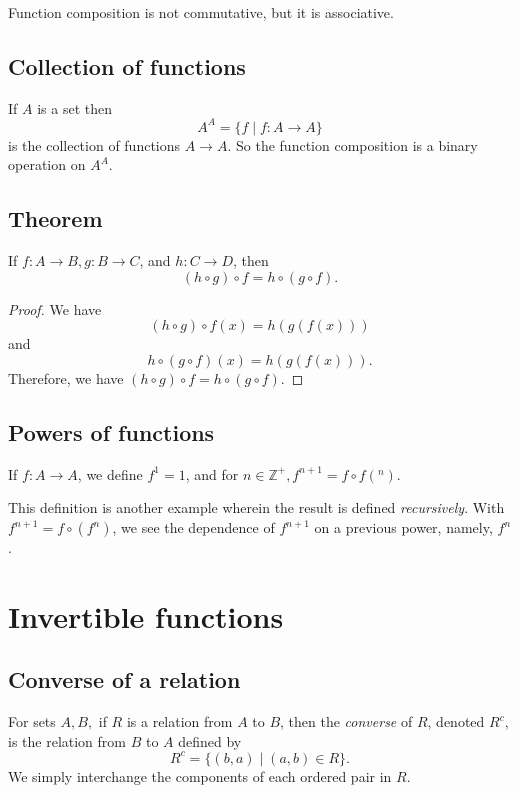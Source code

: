 \documentclass[11pt]{article}
\begin{document}
    Function composition is not commutative, but it is associative.

    \subsection{Collection of functions}

    If $A$ is a set then \[A^A = \{f \mid f:A \rightarrow A\}\] is the collection of functions \(A \rightarrow A\). So the function composition is a binary operation on $A^A$.

    \subsection{Theorem}

    If \(f: A \rightarrow B, g: B \rightarrow C\), and \(h:C \rightarrow D\), then \[ (h \circ g) \circ f = h \circ (g \circ f). \]

    \begin{proof}
        We have \[(h \circ g) \circ f(x) = h(g(f(x)))\] and \[h \circ (g \circ f)(x) = h(g(f(x))).\] Therefore, we have \((h \circ g) \circ f = h \circ (g \circ f).\)
    \end{proof}

    \subsection{Powers of functions}

    If \(f:A \rightarrow A\), we define \(f^1 = 1\), and for \(n \in \mathbb{Z}^+, f^{n+1} = f \circ f(^n).\)

    \vspace{1em}

    This definition is another example wherein the result is defined \emph{recursively}. With \(f^{n+1} = f \circ (f^n)\), we see the dependence of \(f^{n+1}\) on a previous power, namely, \(f^n\).

    \section{Invertible functions}

    \subsection{Converse of a relation}

    For sets \(A,B,\) if $R$ is a relation from $A$ to $B$, then the \emph{converse} of $R$, denoted $R^c$, is the relation from $B$ to $A$ defined by \[R^c = \{(b,a) \mid (a,b) \in R\}.\] We simply interchange the components of each ordered pair in $R$.
\end{document}
